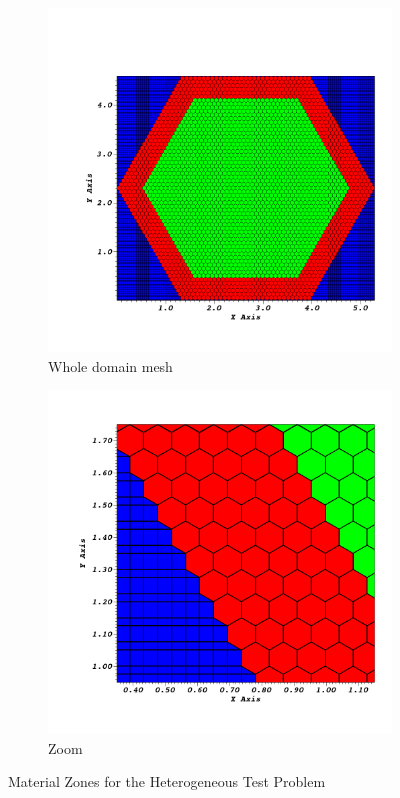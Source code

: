 \documentclass[preprint,10pt]{elsarticle}
\renewcommand{\(}{\left(}
\renewcommand{\)}{\right)}
\renewcommand{\[}{\left[}
\renewcommand{\]}{\right]}
\begin{document}
\begin{figure}[!htbp]
  \centering
  \begin{subfigure}{0.45\textwidth}
    \centering
    \includegraphics[width=\textwidth]{hexa_grid0000}
    \caption{Whole domain mesh}
  \end{subfigure}
  \begin{subfigure}{0.40\textwidth}
    \centering
    \includegraphics[width=\textwidth]{hexa_grid0001}
    \caption{Zoom}
  \end{subfigure}
  \caption{Material Zones for the Heterogeneous Test Problem}
  \label{hex_zones}
\end{figure}
\end{document}
